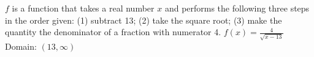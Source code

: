 {$f$ is a function that takes a real number $x$ and performs the following three steps in the order given: (1) subtract 13; (2) take the square root; (3) make the quantity the denominator of a fraction with numerator 4.  
}
{$f(x) = \frac{4}{\sqrt{x - 13}}$ \\ Domain: $(13, \infty)$}
